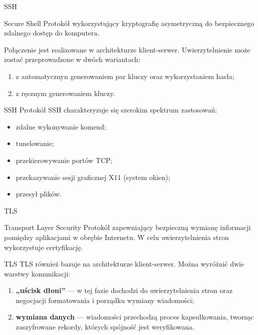\begin{frame}{SSH}
	\begin{alertblock}{Secure Shell}
		Protokół wykorzystujący kryptografię asymetryczną do bezpiecznego zdalnego dostęp do komputera. 
	\end{alertblock}
	
	Połączenie jest realizowane w architekturze klient-serwer. Uwierzytelnienie może zostać przeprowadzone w dwóch wariantach:
	\begin{enumerate}
		\item z automatycznyn generowaniem par kluczy oraz wykorzystaniem hasła;
		\item z ręcznym generowaniem kluczy.
	\end{enumerate}
	
\end{frame}

\begin{frame}{SSH}
	Protokół SSH charakteryzuje się szerokim spektrum zastosowań:
	\begin{itemize}
		\item zdalne wykonywanie komend;
		\item tunelowanie;
		\item przekierowywanie portów TCP;
		\item przekazywanie sesji graficznej X11 (system okien);
		\item przesył plików.
	\end{itemize}
\end{frame}

\begin{frame}{TLS}
	\begin{alertblock}{Transport Layer Security}
		Protokół zapewniający bezpieczną wymianę informacji pomiędzy aplikacjami w obrębie Internetu. W celu uwierzytelnienia stron wykorzystuje certyfikację.
	\end{alertblock}
\end{frame}

\begin{frame}{TLS}
	TLS również bazuje na architekturze klient-serwer. Można wyróżnić dwie warstwy komunikacji:
	\vspace{\fill}
	\begin{enumerate}
		\item \textbf{„uścisk dłoni”} — w tej fazie dochodzi do uwierzytelnienia stron oraz negocjacji formatowania i porządku wymiany wiadomości;
		\vspace{\fill}
		\item \textbf{wymiana danych} — wiadomości przechodzą proces kapsułkowania, tworząc zaszyfrowane rekordy, których spójność jest weryfikowana.
	\end{enumerate}
\end{frame}

